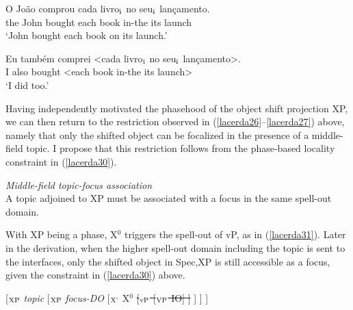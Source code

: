 \documentclass[output=paper]{langscibook}
\begin{document}
\begin{exe}
\ex \label{lacerda29}
\begin{xlist}
 \label{lacerda29A}
\gll O 	João 	comprou 	cada 	livro$_{\textnormal{i}}$ 	no 	seu$_{\textnormal{i}}$ 	lançamento.\\
the 	John 	bought 	each 	book 	in-the 	its 	launch\\
\glt‘John bought each book on its launch.’

 \label{lacerda29B}
\gll Eu 	também 	comprei 	<cada 	livro$_{\textnormal{i}}$ 	no 	seu$_{\textnormal{i}}$ 	lançamento>.\\
I 	also	bought	<each	book 	in-the	its	launch>\\
\glt‘I did too.’

\end{xlist}
\end{exe}

Having independently motivated the phasehood of the object shift projection XP, we can then return to the restriction observed in (\ref{lacerda26}--\ref{lacerda27}) above, namely that only the shifted object can be focalized in the presence of a middle-field topic. I propose that this restriction follows from the phase-based locality constraint in (\ref{lacerda30}).


\begin{exe}
\ex \label{lacerda30}
\emph{Middle-field topic-focus association}\\
A topic adjoined to XP must be associated with a focus in the same spell-out domain.
\end{exe}

With XP being a phase, X$^{0}$ triggers the spell-out of vP, as in (\ref{lacerda31}). Later in the derivation, when the higher spell-out domain including the topic is sent to the interfaces, only the shifted object in Spec,XP is still accessible as a focus, given the constraint in (\ref{lacerda30}) above.

\begin{exe}
\ex \label{lacerda31}
[$_{\textnormal{XP}}$ \emph{topic} [$_{\textnormal{XP}}$ \emph{focus-DO} [$_{\textnormal{X'}}$ X$^{0}$ \sout{[$_{\textnormal{vP}}$ [$_{\textnormal{VP}}$ IO] ]} ] ] ]
\end{exe}
\end{document}
